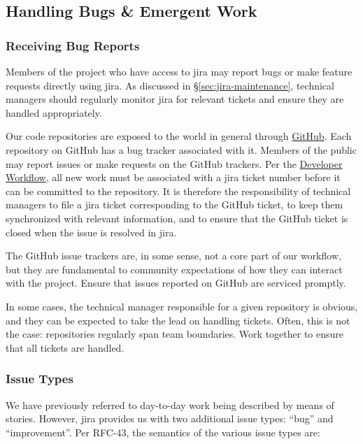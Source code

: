 \subsection{Handling Bugs \& Emergent Work}
\label{sec:bugs}

\subsubsection{Receiving Bug Reports}\label{receiving-bug-reports}

Members of the project who have access to \gls{jira} may report bugs or make feature requests directly using \gls{jira}.
As discussed in \S\ref{sec:jira-maintenance}, technical managers should regularly monitor \gls{jira} for relevant tickets and ensure they are handled appropriately.

Our code repositories are exposed to the world in general through \href{https://github.com/lsst/}{GitHub}.
Each repository on GitHub has a bug tracker associated with it.
Members of the public may report issues or make requests on the GitHub trackers.
Per the \href{https://developer.lsst.io/processes/workflow.html}{Developer Workflow}, all new work must be associated with a \gls{jira} ticket number before it can be committed to the repository.
It is therefore the responsibility of technical managers to file a \gls{jira} ticket corresponding to the GitHub ticket, to keep them synchronized with relevant information, and to ensure that the GitHub ticket is closed when the issue is resolved in \gls{jira}.

The GitHub issue trackers are, in some sense, not a core part of our
workflow, but they are fundamental to community expectations of how they
can interact with the project. Ensure that issues reported on GitHub are
serviced promptly.

In some cases, the technical manager responsible for a given repository
is obvious, and they can be expected to take the lead on handling
tickets. Often, this is not the case: repositories regularly span team
boundaries. Work together to ensure that all tickets are handled.

\subsubsection{Issue Types}\label{issue-types}

We have previously referred to day-to-day work being described by means of stories.
However, \gls{jira} provides us with two additional issue types: ``bug'' and ``improvement''.
Per RFC-43, the semantics of the various issue types are:

